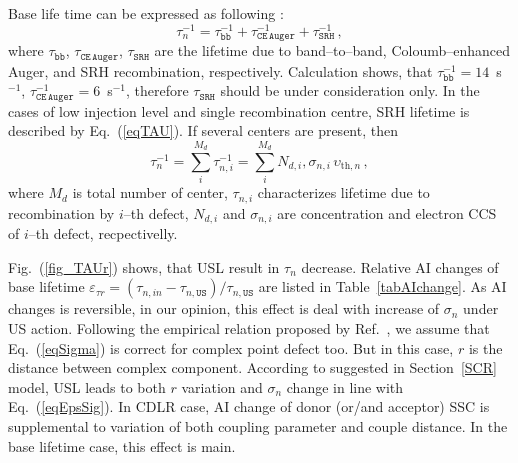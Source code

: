 \documentclass[aip,jap, amsmath,amssymb,reprint]{revtex4-1}
\begin{document}
Base life time can be expressed as following \cite{MurphyJAP2011}:
\begin{equation}
\label{eqTAUsum}
\tau_n^{-1}=\tau_\mathtt{bb}^{-1}+\tau_\mathtt{CE\,Auger}^{-1}+\tau_\mathtt{SRH}^{-1}\,,
\end{equation}
where
$\tau_\mathtt{bb}$, $\tau_\mathtt{CE\,Auger}$, $\tau_\mathtt{SRH}$ are the lifetime due to band--to--band, Coloumb--enhanced Auger, and
SRH recombination, respectively.
Calculation shows, that $\tau_\mathtt{bb}^{-1}=14$~s$^{-1}$, $\tau_\mathtt{CE\,Auger}^{-1}=6$~s$^{-1}$,
therefore $\tau_\mathtt{SRH}$ should be under consideration only.
In the cases of low injection level and single recombination centre, SRH lifetime is described by Eq.~(\ref{eqTAU}).
If several centers are present, then
\begin{equation}
\label{eqTAUSHRsum}
\tau_n^{-1}=\sum_i^{M_d}\tau_{n,i}^{-1}=\sum_i^{M_d}N_{d,i},\sigma_{n,i}\,\upsilon_{\mathrm{th},n}\,,
\end{equation}
where
$M_d$ is total number of center,
$\tau_{n,i}$ characterizes lifetime due to recombination by $i$--th defect,
$N_{d,i}$ and $\sigma_{n,i}$ are concentration and electron CCS of $i$--th defect, recpectivelly.

Fig.~(\ref{fig_TAUr}) shows, that USL result in $\tau_n$ decrease.
Relative AI changes of base lifetime $\varepsilon_{\tau r}=(\tau_{n,in}-\tau_{n,\mathtt{US}})/\tau_{n,\mathtt{US}}$
are listed in Table~\ref{tabAIchange}.
As AI changes is reversible, in our opinion, this effect is deal with increase of $\sigma_n$ under US action.
Following the empirical relation  proposed by Ref.~, we assume that Eq.~(\ref{eqSigma})
is correct for complex point defect too.
But in this case, $r$ is the distance between complex component.
According to suggested in Section~\ref{SCR} model, USL leads to both $r$ variation
and $\sigma_n$ change in line with Eq.~(\ref{eqEpsSig}).
In CDLR case, AI change of donor (or/and acceptor) SSC is supplemental to variation of
both coupling parameter and couple distance.
In the base lifetime case, this effect is main.
\end{document}

